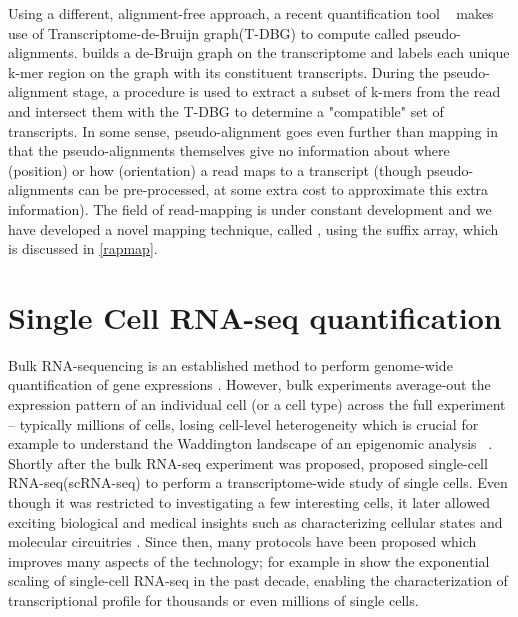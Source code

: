 Using a different, alignment-free approach, a recent quantification tool \kallisto~\citep{kallisto} makes use of Transcriptome-de-Bruijn graph(T-DBG) to compute called pseudo-alignments. \kallisto builds a de-Bruijn graph on the transcriptome and labels each unique k-mer region on the graph with its constituent transcripts. During the pseudo-alignment stage, a procedure is used to extract a subset of k-mers from the read and intersect them with the T-DBG to determine a "compatible" set of transcripts. In some sense, pseudo-alignment goes even further than mapping in that the pseudo-alignments themselves give no information about where (position) or how (orientation) a read maps to a transcript (though pseudo-alignments can be pre-processed, at some extra cost to approximate this extra information). The field of read-mapping is under constant development and we have developed a novel mapping technique, called \qm, using the suffix array, which is discussed in \cref{rapmap}.

\section{Single Cell RNA-seq quantification} 
\label{intro:singlecell}

Bulk RNA-sequencing is an established method to perform genome-wide quantification of gene expressions \citep{mortazavi2008mapping}. However, bulk experiments average-out the expression pattern of an individual cell (or a cell type) across the full experiment -- typically millions of cells, losing cell-level heterogeneity which is crucial for example to understand the Waddington landscape of an epigenomic analysis ~\citep{goldberg2007epigenetics}. Shortly after the bulk RNA-seq experiment was proposed, \citet{tang2009mrna} proposed single-cell RNA-seq(scRNA-seq) to perform a transcriptome-wide study of single cells. Even though it was restricted to investigating a few interesting cells, it later allowed exciting biological and medical insights such as characterizing cellular states and molecular circuitries \citep{encode2012integrated}. Since then, many \singlecell protocols have been proposed which improves many aspects of the technology; for example in  \citep{svensson2018exponential} show the exponential scaling of single-cell RNA-seq in the past decade, enabling the characterization of transcriptional profile for thousands or even millions of single cells.

